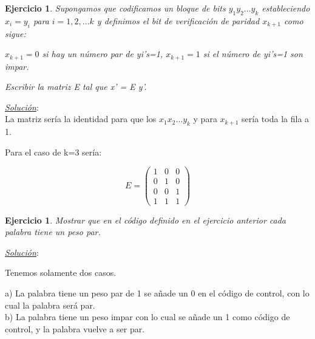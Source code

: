 \documentclass{beamer}
\theoremstyle{plain}
\theoremstyle{example}
\newtheorem{ejercicio} [Ejercicio]{Ejercicio}
\theoremstyle{example}
\begin{document}
\begin{frame}  \small \begin{ejercicio} 
Supongamos que codificamos un bloque de bits $y_1 y_2 \ldots y_k$ estableciendo $x_i =y_i$ para $ i= 1,2,\ldots k$ y definimos el bit de verificación de paridad  $x_{k+1}$ como sigue: 

\vspace{0.2cm}
$x_{k+1} =0$ si hay un número par de yi's=1, $x_{k+1} =1$ si el número de yi's=1 son impar. 

\vspace{0.2cm}
Escribir la matriz E tal que x' = E y'.

\end{ejercicio} %
\textit{\underline{Solución}}:\\ 
\vspace{0.3cm}
La matriz sería la identidad para que los $x_1x_2 \ldots y_k$ y para $x_{k+1}$ sería toda la fila a 1.

Para el caso de k=3 sería:

\[
   E=      \left( \begin{array}{ccc}
                  1 & 0 & 0 \\
                  0 & 1 & 0  \\   
                  0 & 0 & 1 \\
                  1 & 1 & 1  
           			\end{array}
    		\right) 	    		
\]

\end{frame} 


\begin{frame}  \small \begin{ejercicio} 
Mostrar que en el código definido en el ejercicio anterior cada palabra tiene un peso par.
\end{ejercicio} %
\textit{\underline{Solución}}:\\ 
\vspace{0.3cm}

Tenemos solamente dos casos.

a) La palabra tiene un peso par de 1 se añade un 0 en el código de control, con lo cual la palabra será par.\\
b) La palabra tiene un peso impar con lo cual se añade un 1 como código de control, y la palabra vuelve a ser par.

\end{frame} 
\end{document}
